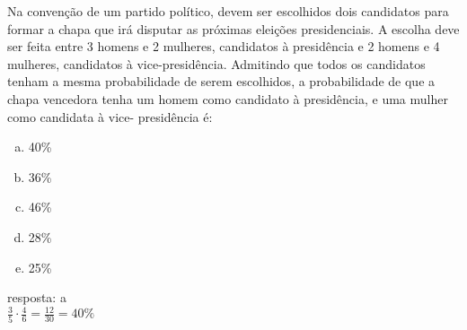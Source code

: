 \begin{ex}
Na convenção de um partido político, devem ser escolhidos dois candidatos para formar a chapa que irá disputar as próximas eleições presidenciais. A escolha deve ser feita entre 3 homens e 2 mulheres, candidatos à presidência e 2 homens e 4 mulheres, candidatos à vice-presidência. Admitindo que todos os candidatos tenham a mesma probabilidade de serem escolhidos,  a probabilidade de que a chapa vencedora tenha um homem como candidato à presidência, e uma mulher como candidata à vice- presidência é:
   \begin{enumerate}[(a)]
   \item 40\%
   \item 36\%
   \item 46\%
   \item 28\%
   \item 25\%
   \end{enumerate}
     \begin{sol}
      resposta: a \\
      $\frac{3}{5}\cdot\frac{4}{6}=\frac{12}{30}=40\%$
     \end{sol}
\end{ex}